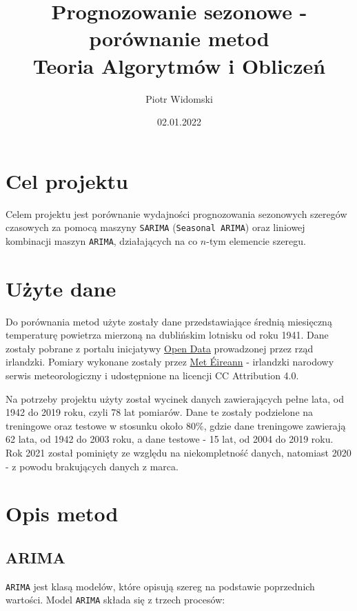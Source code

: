 \documentclass[12pt]{article}
\title{Prognozowanie sezonowe - porównanie metod \\
    \large Teoria Algorytmów i Obliczeń \\}
\author{Piotr Widomski}
\date{02.01.2022}
\begin{document}
\maketitle

\section{Cel projektu}

Celem projektu jest porównanie wydajności prognozowania sezonowych szeregów czasowych za pomocą maszyny \texttt{SARIMA} (\texttt{Seasonal ARIMA}) oraz liniowej kombinacji maszyn \texttt{ARIMA}, działających na co $n$-tym elemencie szeregu.

\section{Użyte dane}

Do porównania metod użyte zostały dane przedstawiające średnią miesięczną temperaturę powietrza mierzoną na dublińskim lotnisku od roku 1941. Dane zostały pobrane z portalu inicjatywy \href{https://data.gov.ie/dataset/dublin-airport-monthly-data?package_type=dataset}{Open Data} prowadzonej przez rząd irlandzki. Pomiary wykonane zostały przez \href{https://www.met.ie/}{Met Éireann} - irlandzki narodowy serwis meteorologiczny i udostępnione na licencji CC Attribution 4.0.

Na potrzeby projektu użyty został wycinek danych zawierających pełne lata, od 1942 do 2019 roku, czyli 78 lat pomiarów. Dane te zostały podzielone na treningowe oraz testowe w stosunku około $80\%$, gdzie dane treningowe zawierają 62 lata, od 1942 do 2003 roku, a dane testowe - 15 lat, od 2004 do 2019 roku. Rok 2021 został pominięty ze względu na niekompletność danych, natomiast 2020 - z powodu brakujących danych z marca.

\section{Opis metod}

\subsection{ARIMA}

\texttt{ARIMA} jest klasą modelów, które opisują szereg na podstawie poprzednich wartości. Model \texttt{ARIMA} składa się z trzech procesów:
\end{document}
